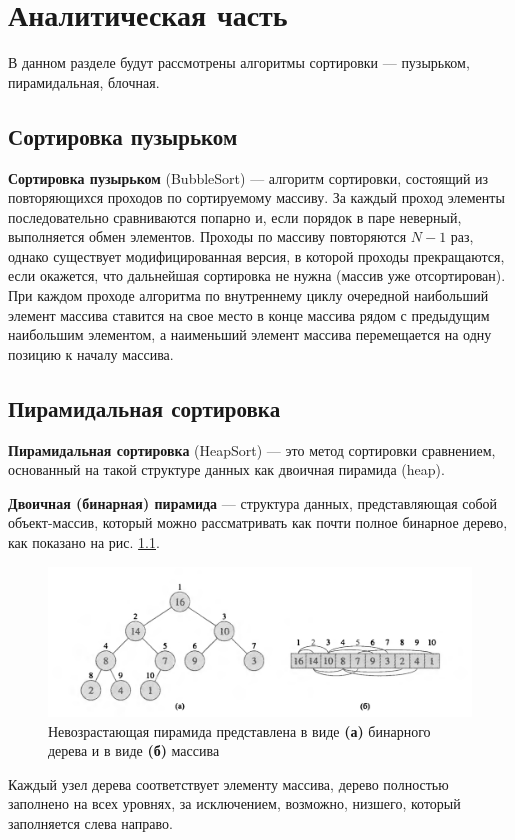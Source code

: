 \chapter{Аналитическая часть}

В данном разделе будут рассмотрены алгоритмы сортировки --- пузырьком, пирамидальная, блочная.

\section{Сортировка пузырьком}
\textbf{Сортировка пузырьком} (BubbleSort) \cite{bubble_source} --- алгоритм сортировки, состоящий из повторяющихся проходов по сортируемому массиву.
За каждый проход элементы последовательно сравниваются попарно и, если порядок в паре неверный, выполняется обмен элементов.
Проходы по массиву повторяются $N-1$ раз, однако существует модифицированная версия, в которой проходы прекращаются, если окажется, что дальнейшая сортировка не нужна (массив уже отсортирован).
При каждом проходе алгоритма по внутреннему циклу очередной наибольший элемент массива ставится на свое место в конце массива рядом с предыдущим наибольшим элементом, а наименьший элемент массива перемещается на одну позицию к началу массива.

\section{Пирамидальная сортировка}
\textbf{Пирамидальная сортировка }(HeapSort) \cite{heapsort_source} --- это метод сортировки сравнением, основанный на такой структуре данных как двоичная пирамида (heap).

\textbf{Двоичная (бинарная) пирамида} --- структура данных, представляющая собой объект-массив, который можно рассматривать как почти полное бинарное дерево, как показано на рис. \ref{fig:heap_exmp}.
\begin{figure}[h]
	\centering
	\includegraphics[width=\linewidth]{img/heap_example.png}
	\caption{Невозрастающая пирамида представлена в виде \textbf{(а)} бинарного дерева и в виде \textbf{(б)} массива}
	\label{fig:heap_exmp}
\end{figure}
Каждый узел дерева соответствует элементу массива, дерево полностью заполнено на всех уровнях, за исключением, возможно, низшего, который заполняется слева направо. 
\pagebreak

